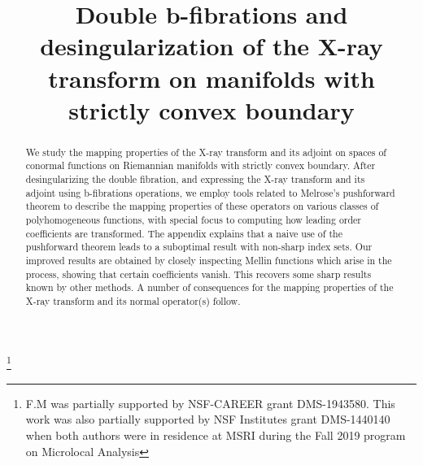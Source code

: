 \documentclass[JEP,XML,SOM,Unicode,NoFloatCountersInSection, NoEqCountersInSection,published]{cedram}
\theoremstyle{plain}
\theoremstyle{definition}
\theoremstyle{remark}
\begin{document}
\frontmatter

\title[Double b-fibrations and desingularization of the X-ray transform...]{Double b-fibrations and desingularization of the X-ray transform on manifolds with strictly convex boundary}

\author[\initial{R.} \lastname{Mazzeo}]{ }
\address{Department of Mathematics, Stanford University,\\
Stanford CA 94305, USA}

\author[\initial{F.} \lastname{Monard}]{ }
\address{Department of Mathematics, University of California\\
Santa Cruz CA 95064, USA}

\thanks{F.M was partially supported by NSF-CAREER grant DMS-1943580. This work was also partially supported by NSF Institutes grant DMS-1440140 when both authors were in residence at MSRI during the Fall 2019 program on Microlocal Analysis}

\begin{abstract}
We study the mapping properties of the X-ray transform and its adjoint on spaces of conormal functions on Riemannian manifolds with strictly convex boundary. After desingularizing the double fibration, and expressing the X-ray transform and its adjoint using b-fibrations operations, we employ tools related to Melrose's pushforward theorem to describe the mapping properties of these operators on various classes of polyhomogeneous functions, with special focus to computing how leading order coefficients are transformed. The appendix explains that a naive use of the pushforward theorem leads to a suboptimal result with non-sharp index sets. Our improved results are obtained by closely inspecting Mellin functions which arise in the process, showing that certain coefficients vanish. This recovers some sharp results known by other methods. A number of consequences for the mapping properties of the X-ray transform and its normal operator(s) follow.
\end{abstract}



\end{document}
